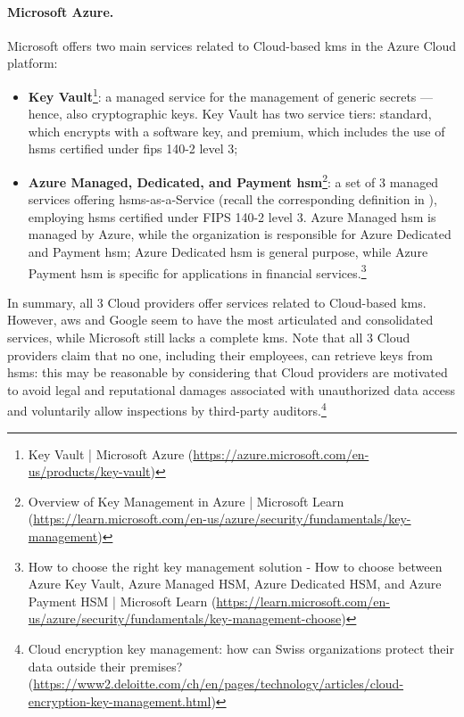 \paragraph*{Microsoft Azure.}

Microsoft offers two main services related to Cloud-based \gls{kms} in the Azure Cloud platform:

\begin{itemize}
	\item \textbf{Key Vault}\footnote{Key Vault | Microsoft Azure (\url{https://azure.microsoft.com/en-us/products/key-vault})}: a managed service for the management of generic secrets --- hence, also cryptographic keys. Key Vault has two service tiers: standard, which encrypts with a software key, and premium, which includes the use of \glspl{hsm} certified under \gls{fips} 140-2 level 3;
	\item \textbf{Azure Managed, Dedicated, and Payment \gls{hsm}}\footnote{Overview of Key Management in Azure | Microsoft Learn (\url{https://learn.microsoft.com/en-us/azure/security/fundamentals/key-management})}: a set of 3 managed services offering \glspl{hsm}-as-a-Service (recall the corresponding definition in ), employing \glspl{hsm} certified under FIPS 140-2 level 3. Azure Managed \gls{hsm} is managed by Azure, while the organization is responsible for Azure Dedicated and Payment \gls{hsm}; Azure Dedicated \gls{hsm} is general purpose, while Azure Payment \gls{hsm} is specific for applications in financial services.\footnote{How to choose the right key management solution - How to choose between Azure Key Vault, Azure Managed HSM, Azure Dedicated HSM, and Azure Payment HSM | Microsoft Learn (\url{https://learn.microsoft.com/en-us/azure/security/fundamentals/key-management-choose})}
\end{itemize}

In summary, all 3 Cloud providers offer services related to Cloud-based \gls{kms}. However, \gls{aws} and Google seem to have the most articulated and consolidated services, while Microsoft still lacks a complete \gls{kms}. Note that all 3 Cloud providers claim that no one, including their employees, can retrieve keys from \glspl{hsm}: this may be reasonable by considering that Cloud providers are motivated to avoid legal and reputational damages associated with unauthorized data access and voluntarily allow inspections by third-party auditors.\footnote{Cloud encryption key management: how can Swiss organizations protect their data outside their premises? (\url{https://www2.deloitte.com/ch/en/pages/technology/articles/cloud-encryption-key-management.html})}



